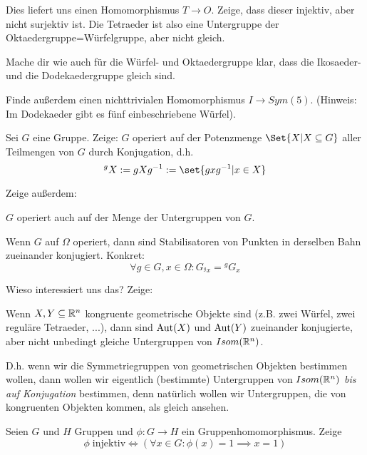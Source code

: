 \begin{sheet}
\begin{problem}[title={Gruppenhomomorphismen}]
\begin{subproblem}
Dies liefert uns einen Homomorphismus $T\to O$. Zeige, dass dieser injektiv, aber nicht surjektiv ist. Die Tetraeder ist also eine Untergruppe der Oktaedergruppe=Würfelgruppe, aber nicht gleich.
\end{subproblem}

\begin{subproblem}[difficulty={mittel bis schwer}]
Mache dir wie auch für die Würfel- und Oktaedergruppe klar, dass die Ikosaeder- und die Dodekaedergruppe gleich sind.

Finde außerdem einen nichttrivialen Homomorphismus $I\to Sym(5)$. (Hinweis: Im Dodekaeder gibt es fünf einbeschriebene Würfel).
\end{subproblem}
\end{problem}


\begin{problem}[title={Operation auf Teilmengen durch Konjugation}]
Sei $G$ eine Gruppe. Zeige: $G$ operiert auf der Potenzmenge $\Set{X | X\subseteq G}$ aller Teilmengen von $G$ durch Konjugation, d.h.
\[{^g X} := gXg^{-1} := \set{gxg^{-1} | x\in X}\]

Zeige außerdem:
\begin{subproblem}
$G$ operiert auch auf der Menge der Untergruppen von $G$.
\end{subproblem}
\begin{subproblem}
Wenn $G$ auf $\Omega$ operiert, dann sind Stabilisatoren von Punkten in derselben Bahn zueinander konjugiert. Konkret:
\[\forall g\in G, x\in\Omega: G_{^g x} = {^g G_x}\]
\end{subproblem}

Wieso interessiert uns das? Zeige:
\begin{subproblem}
Wenn $X,Y\subseteq\mathbb{R}^n$ kongruente geometrische Objekte sind (z.B. zwei Würfel, zwei reguläre Tetraeder, ...), dann sind $\operatorname{Aut}(X)$ und $\operatorname{Aut}(Y)$ zueinander konjugierte, aber nicht unbedingt gleiche Untergruppen von $Isom(\mathbb{R}^n)$.
\end{subproblem}
D.h. wenn wir die Symmetriegruppen von geometrischen Objekten bestimmen wollen, dann wollen wir eigentlich (bestimmte) Untergruppen von $Isom(\mathbb{R}^n)$ \emph{bis auf Konjugation} bestimmen, denn natürlich wollen wir Untergruppen, die von kongruenten Objekten kommen, als gleich ansehen.
\end{problem}


\begin{problem}[title={Injektiv = trivialer Kern}]
Seien $G$ und $H$ Gruppen und $\phi:G\to H$ ein Gruppenhomomorphismus. Zeige
\[\phi\;\text{injektiv} \iff (\forall x\in G: \phi(x)=1 \implies x=1)\]
\end{problem}


\end{sheet}
